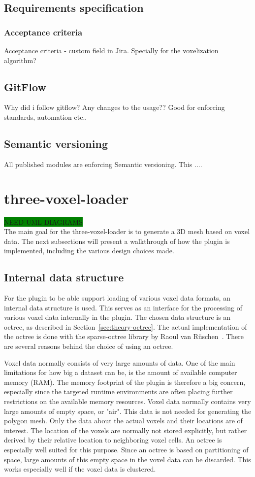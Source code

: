 \subsection{Requirements specification}
\subsubsection{Acceptance criteria}
Acceptance criteria - custom field in Jira.
Specially for the voxelization algorithm?

\subsection{GitFlow}
Why did i follow gitflow? Any changes to the usage?? Good for enforcing standards, automation etc..

\subsection{Semantic versioning}
All published modules are enforcing Semantic versioning. This ....

\section{three-voxel-loader}
\colorbox{green}{NEED UML DIAGRAMS}\\
The main goal for the three-voxel-loader is to generate a 3D mesh based on voxel data. The next subsections will present a walkthrough of how the plugin is implemented, including the various design choices made.

\subsection{Internal data structure}
For the plugin to be able support loading of various voxel data formats, an internal data structure is used. This serves as an interface for the processing of various voxel data internally in the plugin. The chosen data structure is an octree, as described in Section~\ref{sec:theory-octree}. The actual implementation of the octree is done with the sparse-octree library by Raoul van R\"uschen~\cite{sparse-octree}. There are several reasons behind the choice of using an octree. 

Voxel data normally consists of very large amounts of data. One of the main limitations for how big a dataset can be, is the amount of available computer memory (RAM). The memory footprint of the plugin is therefore a big concern, especially since the targeted runtime environments are often placing further restrictions on the available memory resources. Voxel data normally contains very large amounts of empty space, or "air". This data is not needed for generating the polygon mesh. Only the data about the actual voxels and their locations are of interest. The location of the voxels are normally not stored explicitly, but rather derived by their relative location to neighboring voxel cells. An octree is especially well suited for this purpose. Since an octree is based on partitioning of space, large amounts of this empty space in the voxel data can be discarded. This works especially well if the voxel data is clustered.

